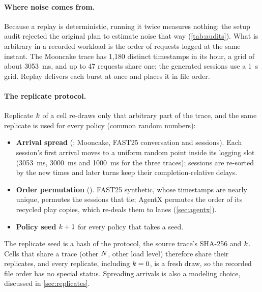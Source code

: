 \paragraph{Where noise comes from.}
Because a replay is deterministic, running it twice measures nothing; the setup audit rejected
the original plan to estimate noise that way (\cref{tab:audits}). What is arbitrary in a recorded
workload is the order of requests logged at the same instant.
The Mooncake trace has 1,180 distinct timestamps in its hour, a grid of about \SI{3053}{ms}, and
up to 47 requests share one; the generated sessions use a \SI{1}{s} grid. Replay delivers each
burst at once and places it in file order.

\paragraph{The replicate protocol.}
Replicate $k$ of a cell re-draws only that arbitrary part of the trace, and the same
replicate is used for every policy (common random numbers):
\begin{itemize}
  \item \textbf{Arrival spread} (; Mooncake, FAST25 conversation and
    sessions). Each session's first arrival moves to a uniform random point inside its logging
    slot (\SI{3053}{ms}, \SI{3000}{ms} and \SI{1000}{ms} for the three traces); sessions are
    re-sorted by the new times and later turns keep their completion-relative delays.
  \item \textbf{Order permutation} (). FAST25 synthetic, whose timestamps are
    nearly unique, permutes the sessions that tie; AgentX permutes the order of its recycled
    play copies, which re-deals them to lanes (\cref{sec:agentx}).
  \item \textbf{Policy seed} $k + 1$ for every policy that takes a seed.
\end{itemize}
The replicate seed is a hash of the protocol, the source trace's SHA-256 and $k$. Cells that
share a trace (other $N$, other load level) therefore share their replicates, and every
replicate, including $k = 0$, is a fresh draw, so the recorded file order has no special
status.
Spreading arrivals is also a modeling choice, discussed in \cref{sec:replicates}.

